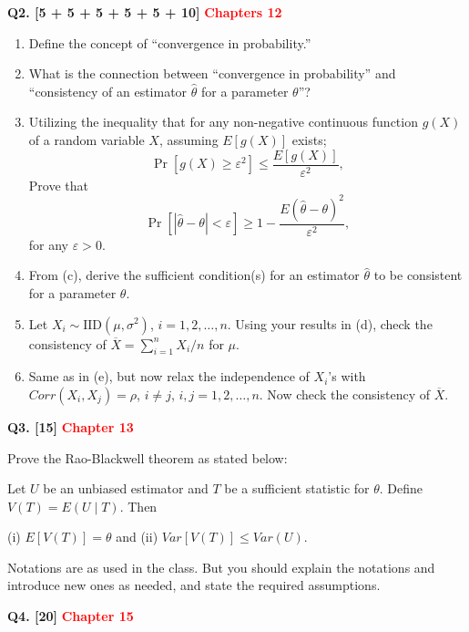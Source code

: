 \documentclass[11pt]{article}
\begin{document}
\bigskip

\textbf{Q2. [5 + 5 + 5 + 5 + 5 + 10]} \textbf{\textcolor{red}{Chapters 12}}

\begin{enumerate}
\item[(a)] Define the concept of ``convergence in probability.''

\item[(b)] What is the connection between ``convergence in probability'' and ``consistency of an estimator $\hat\theta$ for a parameter $\theta$''?

\item[(c)] Utilizing the inequality that for any non-negative continuous function $g(X)$ of a random variable $X$, assuming $E[g(X)]$ exists;
\[
\Pr[g(X)\geq\varepsilon^2]\leq\frac{E[g(X)]}{\varepsilon^2},
\]
Prove that
\[
\Pr[|\hat\theta-\theta|<\varepsilon]\geq 1-\frac{E(\hat\theta-\theta)^2}{\varepsilon^2},
\]
for any $\varepsilon>0$.

\item[(d)] From (c), derive the sufficient condition(s) for an estimator $\hat\theta$ to be consistent for a parameter $\theta$.

\item[(e)] Let $X_i\sim\mathrm{IID}(\mu,\sigma^2)$, $i=1,2,\ldots,n$. Using your results in (d), check the consistency of $\overline X=\sum_{i=1}^{n}X_i/n$ for $\mu$.

\item[(f)] Same as in (e), but now relax the independence of $X_i$'s with $Corr(X_i,X_j)=\rho$, $i\neq j$, $i,j=1,2,\ldots,n$. Now check the consistency of $\overline X$.
\end{enumerate}

\bigskip

\textbf{Q3. [15]} \textbf{\textcolor{red}{Chapter 13}}

Prove the Rao-Blackwell theorem as stated below:

Let $U$ be an unbiased estimator and $T$ be a sufficient statistic for $\theta$. Define $V(T)=E(U\mid T)$. Then

(i) $E[V(T)]=\theta$ and (ii) $Var[V(T)]\leq Var(U)$.

Notations are as used in the class. But you should explain the notations and introduce new ones as needed, and state the required assumptions.

\bigskip

\textbf{Q4. [20]} \textbf{\textcolor{red}{Chapter 15}}
\end{document}
